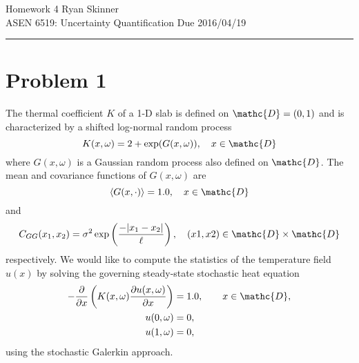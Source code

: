 \documentclass[11pt]{article}
\begin{document}
\newcommand{\widesim}[2][1.5]{
  \mathrel{\overset{#2}{\scalebox{#1}[1]{$\sim$}}}
}

\pagestyle{fancyplain}
\lhead{}
\chead{}
\rhead{}
\cfoot{\hrule \thepage}

\noindent
{\Large Homework 4}
\hfill
{\large Ryan Skinner}
\\[0.5ex]
{\large ASEN 6519: Uncertainty Quantification}
\hfill
{\large Due 2016/04/19}\\
\hrule
\vspace{6pt}

\section*{Problem 1} %

The thermal coefficient $K$ of a 1-D slab is defined on $\mathc{D} = (0,1)$ and is characterized by a shifted log-normal random process
\begin{equation}
K(x,\omega) = 2 + \exp(G(x,\omega)), \quad x \in \mathc{D}
\end{equation}
where $G(x,\omega)$ is a Gaussian random process also defined on $\mathc{D}$. The mean and covariance functions of $G(x,\omega)$ are
\begin{equation}
\xpect{G(x,\cdot)} = 1.0, \quad x \in \mathc{D}
\end{equation}
and
\begin{equation}
C_{GG}(x_1,x_2) = \sigma^2 \exp \left( \frac{- | x_1-x_2 | }{\ell} \right), \quad (x1,x2) \in \mathc{D} \times \mathc{D}
\end{equation}
respectively. We would like to compute the statistics of the temperature field $u(x)$ by solving the governing steady-state stochastic heat equation
\begin{equation}
\begin{aligned}
-\pp{}{x} \left( K(x,\omega) \pp{u(x,\omega)}{x} \right) &= 1.0, \qquad x \in \mathc{D}, \\
u(0,\omega) &= 0, \\
u(1,\omega) &= 0,
\end{aligned}
\label{eq:pde}
\end{equation}
using the stochastic Galerkin approach.
\end{document}

